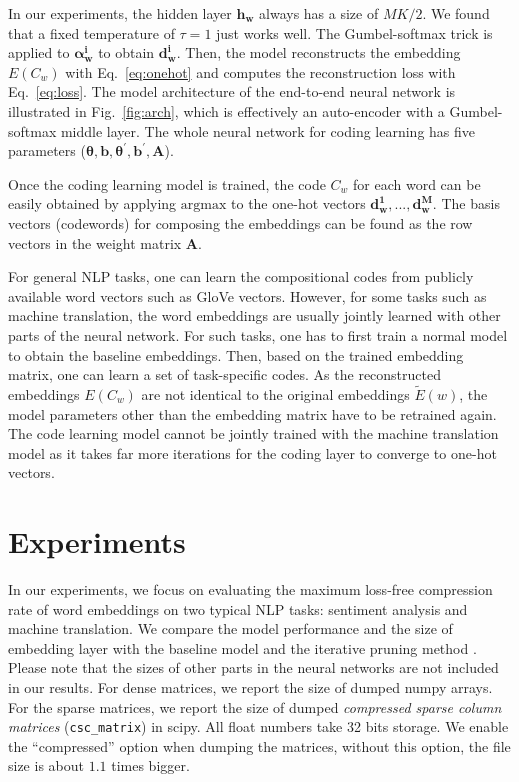 \documentclass{article} %
\begin{document}
In our experiments, the hidden layer $\bm{h_w}$ always has a size of $MK/2$. We found that a fixed temperature of $\tau=1$ just works well. The Gumbel-softmax trick is applied to $\bm{\alpha^i_w}$ to obtain $\bm{d^i_w}$. Then, the model reconstructs the embedding $E(  C_w)$ with Eq.~\ref{eq:onehot} and computes the reconstruction loss with Eq.~\ref{eq:loss}. The model architecture of the end-to-end neural network is illustrated in Fig.~\ref{fig:arch}, which is effectively an auto-encoder with a Gumbel-softmax middle layer. The whole neural network for coding learning has five parameters ($\bm{\theta}, \bm{b}, \bm{\theta^\prime}, \bm{b^\prime}, \bm{A}$).

Once the coding learning model is trained, the code $C_w$ for each word can be easily obtained by applying $\mathrm{argmax}$ to the one-hot vectors $\bm{d^1_w}, ..., \bm{d^M_w}$. The basis vectors (codewords) for composing the embeddings can be found as the row vectors in the weight matrix $\bm{A}$.

For general NLP tasks, one can learn the compositional codes from publicly available word vectors such as GloVe vectors. However, for some tasks such as machine translation, the word embeddings are usually jointly learned with other parts of the neural network. For such tasks, one has to first train a normal model to obtain the baseline embeddings. Then, based on the trained embedding matrix, one can learn a set of task-specific codes. As the reconstructed embeddings $E(C_w)$ are not identical to the original embeddings $\tilde E(w)$, the model parameters other than the embedding matrix have to be retrained again. The code learning model cannot be jointly trained with the machine translation model as it takes far more iterations for the coding layer to converge to one-hot vectors. 


\section{Experiments}


In our experiments, we focus on evaluating the maximum loss-free compression rate of word embeddings on two typical NLP tasks: sentiment analysis and machine translation. We compare the model performance and the size of embedding layer with the baseline model and the iterative pruning method \citep{Han2015LearningBW}. Please note that the sizes of other parts in the neural networks are not included in our results. For dense matrices, we report the size of dumped numpy arrays. For the sparse matrices, we report the size of dumped {\it compressed sparse column matrices} (\texttt{\small csc\_matrix}) in scipy. All float numbers take 32 bits storage. We enable the ``compressed'' option when dumping the matrices, without this option, the file size is about $1.1$ times bigger.
\end{document}
